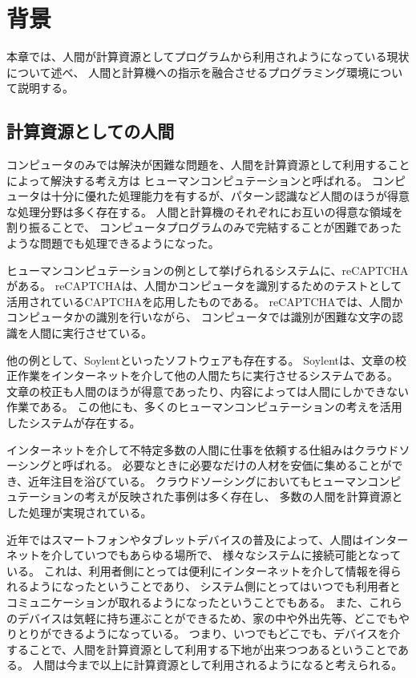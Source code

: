 \chapter{背景}\label{chap:background}

本章では、人間が計算資源としてプログラムから利用されようになっている現状について述べ、
人間と計算機への指示を融合させるプログラミング環境について説明する。

\newpage

\section{計算資源としての人間}\label{sec:human-as-computational-resources}

コンピュータのみでは解決が困難な問題を、人間を計算資源として利用することによって解決する考え方は
ヒューマンコンピュテーション\cite{humancomputation}と呼ばれる。
コンピュータは十分に優れた処理能力を有するが、パターン認識など人間のほうが得意な処理分野は多く存在する。
人間と計算機のそれぞれにお互いの得意な領域を割り振ることで、
コンピュータプログラムのみで完結することが困難であったような問題でも処理できるようになった。

ヒューマンコンピュテーションの例として挙げられるシステムに、reCAPTCHA\cite{recaptcha}がある。
reCAPTCHAは、人間かコンピュータを識別するためのテストとして活用されているCAPTCHA\cite{captcha}を応用したものである。
reCAPTCHAでは、人間かコンピュータかの識別を行いながら、
コンピュータでは識別が困難な文字の認識を人間に実行させている。

他の例として、Soylent\cite{soylent}といったソフトウェアも存在する。
Soylentは、文章の校正作業をインターネットを介して他の人間たちに実行させるシステムである。
文章の校正も人間のほうが得意であったり、内容によっては人間にしかできない作業である。
この他にも、多くのヒューマンコンピュテーションの考えを活用したシステムが存在する。

インターネットを介して不特定多数の人間に仕事を依頼する仕組みはクラウドソーシング\cite{riseofcrowdsourcing}と呼ばれる。
必要なときに必要なだけの人材を安価に集めることができ、近年注目を浴びている。
クラウドソーシングにおいてもヒューマンコンピュテーションの考えが反映された事例は多く存在し、
多数の人間を計算資源とした処理が実現されている。

近年ではスマートフォンやタブレットデバイスの普及によって、人間はインターネットを介していつでもあらゆる場所で、
様々なシステムに接続可能となっている。
これは、利用者側にとっては便利にインターネットを介して情報を得られるようになったということであり、
システム側にとってはいつでも利用者とコミュニケーションが取れるようになったということでもある。
また、これらのデバイスは気軽に持ち運ぶことができるため、家の中や外出先等、どこでもやりとりができるようになっている。
つまり、いつでもどこでも、デバイスを介することで、人間を計算資源として利用する下地が出来つつあるということである。
人間は今まで以上に計算資源として利用されるようになると考えられる。

